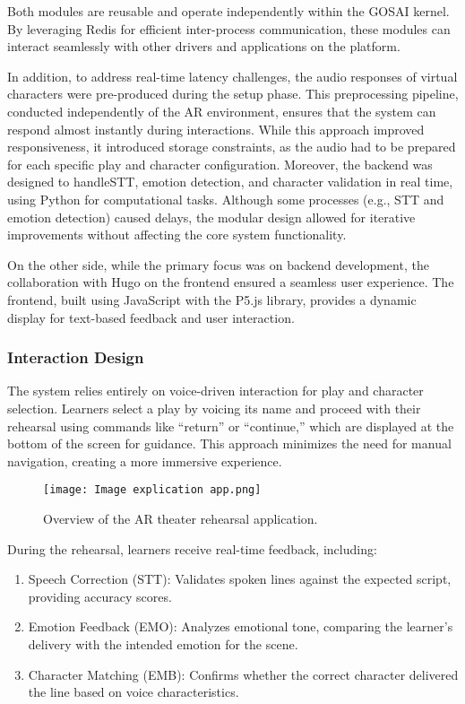 Both modules are reusable and operate independently within the GOSAI kernel. By leveraging Redis for efficient inter-process communication, these modules can interact seamlessly with other drivers and applications on the platform.

In addition, to address real-time latency challenges, the audio responses of virtual characters were pre-produced during the setup phase. This preprocessing pipeline, conducted independently of the AR environment, ensures that the system can respond almost instantly during interactions. While this approach improved responsiveness, it introduced storage constraints, as the audio had to be prepared for each specific play and character configuration. Moreover, the backend was designed to handleSTT, emotion detection, and character validation in real time, using Python for computational tasks. Although some processes (e.g., STT and emotion detection) caused delays, the modular design allowed for iterative improvements without affecting the core system functionality.

On the other side, while the primary focus was on backend development, the collaboration with Hugo on the frontend ensured a seamless user experience. The frontend, built using JavaScript with the P5.js library, provides a dynamic display for text-based feedback and user interaction.

\subsubsection{Interaction Design}

The system relies entirely on voice-driven interaction for play and character selection. Learners select a play by voicing its name and proceed with their rehearsal using commands like “return” or “continue,” which are displayed at the bottom of the screen for guidance. This approach minimizes the need for manual navigation, creating a more immersive experience.

\begin{figure}[h!]
    \centering
    \texttt{[image: Image explication app.png]}
    \caption{Overview of the AR theater rehearsal application.}
    \vspace{0.1cm}
    \label{fig:app_explication}
\end{figure}

During the rehearsal, learners receive real-time feedback, including:
\begin{enumerate}
\item Speech Correction (STT): Validates spoken lines against the expected script, providing accuracy scores.
\item Emotion Feedback (EMO): Analyzes emotional tone, comparing the learner’s delivery with the intended emotion for the scene.
\item Character Matching (EMB): Confirms whether the correct character delivered the line based on voice characteristics.
\end{enumerate}


